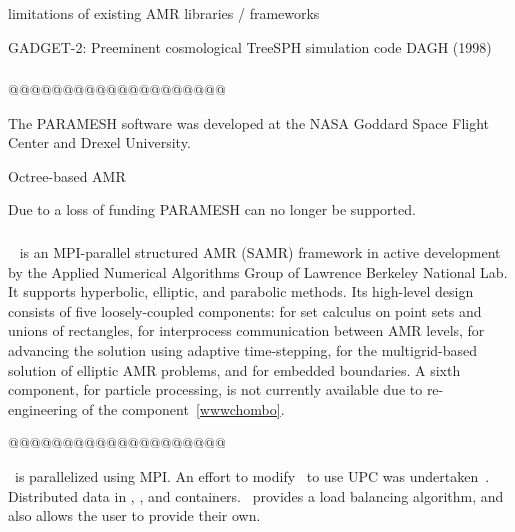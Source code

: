 \documentclass{article}
\begin{document}
limitations of existing AMR libraries / frameworks

GADGET-2: Preeminent cosmological TreeSPH simulation code
DAGH (1998)

\subsubsection{} \label{sss:paramesh}

@@@@@@@@@@@@@@@@@@@@

\nocite{wwwparamesh}
\nocite{MaOl00} %
\nocite{OlMa05}
\nocite{Ol06}

The PARAMESH software was developed at the NASA Goddard Space Flight
Center and Drexel University.

Octree-based AMR


Due to a loss of funding PARAMESH can no longer be supported.

\subsubsection{\chombo} \label{sss:chombo}



\chombo~\nocite{CoGr09} is an MPI-parallel structured AMR (SAMR)
framework in active development by the Applied Numerical Algorithms
Group of Lawrence Berkeley National Lab.  It supports hyperbolic,
elliptic, and parabolic methods. Its high-level design consists of
five loosely-coupled components:  for set calculus on
point sets and unions of rectangles,  for interprocess
communication between AMR levels,  for
advancing the solution using adaptive time-stepping,
 for the multigrid-based solution of elliptic AMR
problems, and  for embedded boundaries.  A sixth
component,  for particle processing, is not
currently available due to re-engineering of the
component~\ref{wwwchombo}.

@@@@@@@@@@@@@@@@@@@@

\chombo\ is parallelized using MPI.  An effort to modify \chombo\ to
use UPC was undertaken~\cite{We04}.
Distributed data in , , and
 containers.  \chombo\ provides a load balancing
algorithm, and also allows the user to provide their own.
\end{document}
